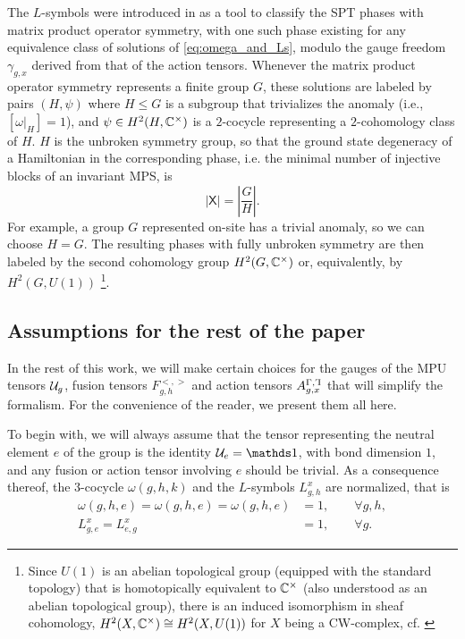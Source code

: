 \documentclass[reprint,
superscriptaddress,
amsmath,amssymb,
notitlepage,
aps,
prb,
10pt, 
tightenlines
]{revtex4-2}
\begin{document}
The $L$-symbols were introduced in \cite{GarreLootensMolnar} as a tool to classify the SPT phases with matrix product operator symmetry, with one such phase existing for any equivalence class of solutions of \eqref{eq:omega_and_Ls}, modulo the gauge freedom $\gamma_{g,x}$ derived from that of the action tensors. Whenever the matrix product operator symmetry represents a finite group $G$, these solutions are labeled by pairs $(H, \psi)$ where $H\leq G$ is a subgroup that trivializes the anomaly (i.e., $[\omega|_H]=1$), and $\psi\in H^2(H, \mathbb{C}^\times)$ is a $2$-cocycle representing a $2$-cohomology class of $H$. $H$ is the unbroken symmetry group, so that the ground state degeneracy of a Hamiltonian in the corresponding phase, i.e. the minimal number of injective blocks of an invariant MPS, is 
\begin{equation}
    |\mathsf{X}|=\left|\dfrac{G}{H}\right|.
\end{equation}
For example, a group $G$ represented on-site has a trivial anomaly, so we can choose $H=G$. The resulting phases with fully unbroken symmetry are then labeled by the second cohomology group $H^2(G, \mathbb{C}^\times)$ or, equivalently, by $H^2(G,U(1))$ \footnote{Since $U(1)$ is an abelian topological group (equipped with the standard topology) that is homotopically equivalent to $\mathbb{C}^\times$ (also understood as an abelian topological group), there is an induced isomorphism in sheaf cohomology, $H^2(X,\mathbb{C}^\times)\cong H^2(X,U(1))$ for $X$ being a CW-complex, cf. \cite{Brown}}.

\subsection{Assumptions for the rest of the paper}
\label{sec:assumptions}
In the rest of this work, we will make certain choices for the gauges of the MPU tensors $\mathcal{U}_g$, fusion tensors $F^{<,>}_{g,h}$ and action tensors $A^{\Gamma, \ammaG}_{g,x}$ that will simplify the formalism. For the convenience of the reader, we present them all here. 

To begin with, we will always assume that the tensor representing the neutral element $e$ of the group is the identity $\mathcal{U}_e=\I$, with bond dimension $1$, and any fusion or action tensor involving $e$ should be trivial. As a consequence thereof, the $3$-cocycle $\omega(g,h,k)$ and the $L$-symbols $L_{g,h}^x$ are normalized, that is
\begin{align}
    \omega(g, h, e) = \omega(g, h, e) = \omega(g, h, e) &= 1,\qquad \forall g,h,\label{eq:triv_omegas}\\
    L^x_{g,e} = L^x_{e, g} &= 1,\qquad \forall g.\label{eq:triv_Ls}
\end{align}
\end{document}
